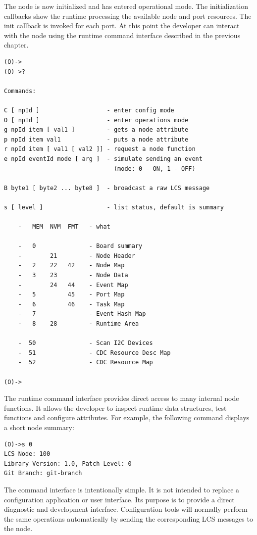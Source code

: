 The node is now initialized and has entered operational mode. The initialization
callbacks show the runtime processing the available node and port resources.
The init callback is invoked for each port.
At this point the developer can interact with the node using the runtime command
interface described in the previous chapter.

\begin{lstlisting}[style=codesnippetstyle]
(O)->
(O)->?

Commands:

C [ npId ]                   - enter config mode
O [ npId ]                   - enter operations mode
g npId item [ val1 ]         - gets a node attribute
p npId item val1             - puts a node attribute
r npId item [ val1 [ val2 ]] - request a node function
e npId eventId mode [ arg ]  - simulate sending an event
                               (mode: 0 - ON, 1 - OFF)

B byte1 [ byte2 ... byte8 ]  - broadcast a raw LCS message

s [ level ]                  - list status, default is summary

    -   MEM  NVM  FMT   - what

    -   0               - Board summary
    -        21         - Node Header
    -   2    22   42    - Node Map
    -   3    23         - Node Data
    -        24   44    - Event Map
    -   5         45    - Port Map
    -   6         46    - Task Map
    -   7               - Event Hash Map
    -   8    28         - Runtime Area

    -  50               - Scan I2C Devices
    -  51               - CDC Resource Desc Map
    -  52               - CDC Resource Map

(O)->
\end{lstlisting}

The runtime command interface provides direct access to many internal node
functions. It allows the developer to inspect runtime data structures, test
functions and configure attributes.
For example, the following command displays a short node summary:

\begin{lstlisting}[style=codesnippetstyle]
(O)->s 0
LCS Node: 100
Library Version: 1.0, Patch Level: 0
Git Branch: git-branch
\end{lstlisting}

The command interface is intentionally simple. It is not intended to replace a
configuration application or user interface. Its purpose is to provide a direct
diagnostic and development interface.
Configuration tools will normally perform the same operations automatically by
sending the corresponding LCS messages to the node.

